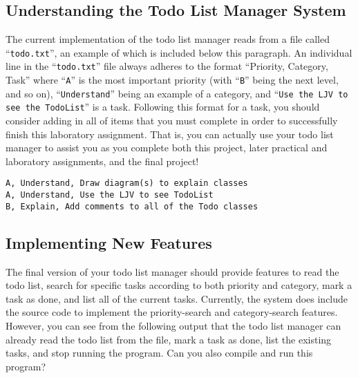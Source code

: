 \vspace{-0.1in}
\subsection*{Understanding the Todo List Manager System}
\vspace{-0.05in}

The current implementation of the todo list manager reads from a file called ``{\tt todo.txt}'', an example of which is
included below this paragraph. An individual line in the ``{\tt todo.txt}'' file always adheres to the format
``Priority, Category, Task'' where ``{\tt A}'' is the most important priority (with ``{\tt B}'' being the next level,
  and so on), ``{\tt Understand}'' being an example of a category, and ``{\tt Use the LJV to see the TodoList}'' is a
task.  Following this format for a task, you should consider adding in all of items that you must complete in order to
successfully finish this laboratory assignment. That is, you can actually use your todo list manager to assist you as
you complete both this project, later practical and laboratory assignments, and the final project!

\vspace{-0.05in}
\begin{verbatim}
A, Understand, Draw diagram(s) to explain classes
A, Understand, Use the LJV to see TodoList
B, Explain, Add comments to all of the Todo classes 
\end{verbatim}
\vspace{-0.05in}

\vspace{-0.15in}
\subsection*{Implementing New Features}
\vspace{-0.05in}

The final version of your todo list manager should provide features to read the todo list, search for specific tasks
according to both priority and category, mark a task as done, and list all of the current tasks.  Currently, the system
does include the source code to implement the priority-search and category-search features. However, you can see from
the following output that the todo list manager can already read the todo list from the file, mark a task as done, list
the existing tasks, and stop running the program. Can you also compile and run this program?

